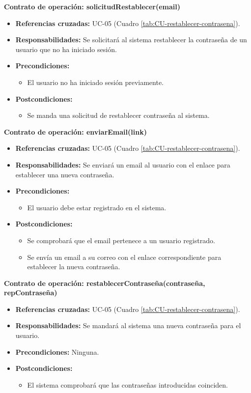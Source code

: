 \textbf{Contrato de operación: solicitudRestablecer(email)}
\begin{itemize}
\item \textbf{Referencias cruzadas:} UC-05 (Cuadro \ref{tab:CU-restablecer-contrasena}).
\item \textbf{Responsabilidades:} Se solicitará al sistema restablecer la contraseña de un usuario que no ha iniciado sesión.
\item \textbf{Precondiciones:} 
 \begin{itemize}
\item El usuario no ha iniciado sesión previamente.
\end {itemize}
\item \textbf{Postcondiciones:} 
 \begin{itemize}
\item Se manda una solicitud de restablecer contraseña al sistema.
\end {itemize}
\end {itemize}

\textbf{Contrato de operación: enviarEmail(link)}
\begin{itemize}
\item \textbf{Referencias cruzadas:} UC-05 (Cuadro \ref{tab:CU-restablecer-contrasena}).
\item \textbf{Responsabilidades:} Se enviará un email al usuario con el enlace para establecer una nueva contraseña.
\item \textbf{Precondiciones:} 
 \begin{itemize}
\item El usuario debe estar registrado en el sistema.
\end {itemize}
\item \textbf{Postcondiciones:} 
 \begin{itemize}
\item Se comprobará que el email pertenece a un usuario registrado.
\item Se envía un email a su correo con el enlace correspondiente para establecer la nueva contraseña.
\end {itemize}
\end {itemize}

\textbf{Contrato de operación: restablecerContraseña(contraseña, repContraseña)}
\begin{itemize}
\item \textbf{Referencias cruzadas:} UC-05 (Cuadro \ref{tab:CU-restablecer-contrasena}).
\item \textbf{Responsabilidades:} Se mandará al sistema una nueva contraseña para el usuario.
\item \textbf{Precondiciones:} Ninguna.
\item \textbf{Postcondiciones:} 
 \begin{itemize}
\item El sistema comprobará que las contraseñas introducidas coinciden.
\end {itemize}
\end {itemize}


